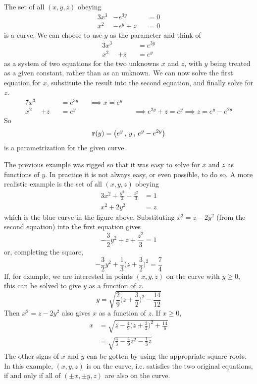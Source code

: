 \begin{eg}\label{eg:paramIntersect}
The set of all $(x,y,z)$ obeying
\begin{alignat*}{3}
 x^3&-e^{3y}           &&=0 \\
 x^2&-e^{y} +z &&=0
\end{alignat*}
is a curve. We can choose to use $y$ as the parameter and think of 
\begin{alignat*}{3}
 x^3&    &&=e^{3y} \\
 x^2&+z  &&=e^{y}
\end{alignat*}
as a system of two equations for the two unknowns $x$ and $z$,
with $y$ being treated as a given constant, rather than as an unknown.
We can now solve the first equation for $x$, substitute the result into
the second equation, and finally solve for $z$.
\begin{alignat*}{7}
 x^3&    &&=e^{3y}  &&\implies x=e^y \\
 x^2&+z  &&=e^{y}   && &&\implies e^{2y}+z=e^y \implies z=e^y-e^{2y}
\end{alignat*}
So
\begin{equation*}
\mathbf{r}(y) = \big(e^y\,,\,y\,,\,e^y-e^{2y}\big)
\end{equation*}
is a parametrization for the given curve.
\end{eg}


\begin{eg}\label{eg:paramIntersectB}
The previous example was rigged so that it was easy to solve
for $x$ and $z$ as functions of $y$. In practice it is not always
easy, or even possible, to do so. A more realistic example is 
the set of all $(x,y,z)$ obeying
\begin{alignat*}{3}
 x^2+\frac{y^2}{2}+\frac{z^2}{3}&=1  \\
 x^2+2y^2&=z
\end{alignat*}
which is the blue curve in the figure above. 
Substituting $x^2=z-2y^2$ (from the second equation)
into the first equation gives 
\begin{equation*}
-\frac{3}{2}y^2+z+\frac{z^2}{3}=1
\end{equation*}
or, completing the square,
\begin{equation*}
-\frac{3}{2}y^2 + \frac{1}{3}\Big(z+\frac{3}{2}\Big)^2 = \frac{7}{4}
\end{equation*}
If, for example, we are interested in points $(x,y,z)$ on the curve with 
$y\ge 0$, this can be solved to give $y$ as a function of $z$.
\begin{equation*}
y=\sqrt{\frac{2}{9}\Big(z+\frac{3}{2}\Big)^2-\frac{14}{12}}
\end{equation*}
Then $x^2=z-2y^2$ also gives $x$ as a function of $z$. If $x\ge 0$,
\begin{align*}
x&=\sqrt{z-\frac{4}{9}\Big(z+\frac{3}{2}\Big)^2+\frac{14}{6}} \\
&=\sqrt{\frac{4}{3}-\frac{4}{9}z^2-\frac{1}{3}z} 
\end{align*}
The other signs of $x$ and $y$ can be gotten by using the appropriate
square roots. In this example, $(x,y,z)$ is on the curve, i.e. satisfies
the two original equations, if and only if all of $(\pm x,\pm y, z)$ are also
on the curve.

\end{eg}


